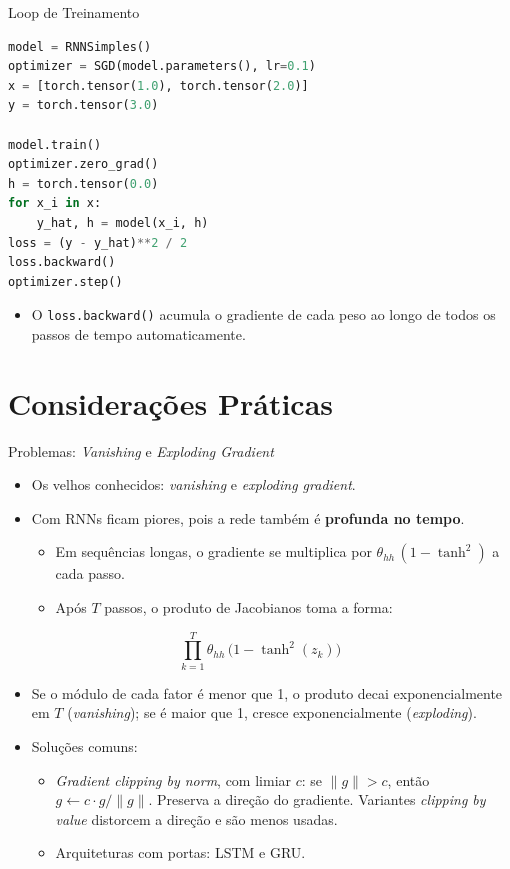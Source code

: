 \documentclass[aspectratio=169,xcolor=dvipsnames]{beamer}
\begin{document}
\begin{frame}[fragile]{Loop de Treinamento}
\begin{lstlisting}[style=vscode-light, basicstyle=\ttfamily\scriptsize, language=Python]
model = RNNSimples()
optimizer = SGD(model.parameters(), lr=0.1)
x = [torch.tensor(1.0), torch.tensor(2.0)]
y = torch.tensor(3.0)

model.train()
optimizer.zero_grad()
h = torch.tensor(0.0)
for x_i in x:
    y_hat, h = model(x_i, h)
loss = (y - y_hat)**2 / 2
loss.backward()
optimizer.step()
\end{lstlisting}
\begin{itemize}
    \item O \texttt{loss.backward()} acumula o gradiente de cada peso ao longo de todos os passos de tempo automaticamente.
\end{itemize}
\end{frame}

\section{Considerações Práticas}

\begin{frame}{Problemas: \textit{Vanishing} e \textit{Exploding Gradient}}
\begin{itemize}\small
    \item Os velhos conhecidos: \textit{vanishing} e \textit{exploding gradient}.
    \item Com RNNs ficam piores, pois a rede também é \textbf{profunda no tempo}.
    \begin{itemize}
        \item Em sequências longas, o gradiente se multiplica por $\theta_{hh}\,(1-\tanh^2)$ a cada passo.
        \item Após $T$ passos, o produto de Jacobianos toma a forma:
    \end{itemize}
\end{itemize}
\vspace{-0.3em}
\[
    \prod_{k=1}^{T} \theta_{hh}\,\bigl(1-\tanh^2(z_k)\bigr)
\]
\vspace{-0.6em}
\begin{itemize}\small
    \item Se o módulo de cada fator é menor que 1, o produto decai exponencialmente em $T$ (\textit{vanishing}); se é maior que 1, cresce exponencialmente (\textit{exploding}).
    \item Soluções comuns:
    \begin{itemize}
        \item \textit{Gradient clipping by norm}, com limiar $c$: se $\|g\| > c$, então $g \leftarrow c \cdot g/\|g\|$. Preserva a direção do gradiente. Variantes \textit{clipping by value} distorcem a direção e são menos usadas.
        \item Arquiteturas com portas: LSTM e GRU.
    \end{itemize}
\end{itemize}
\end{frame}
\end{document}
